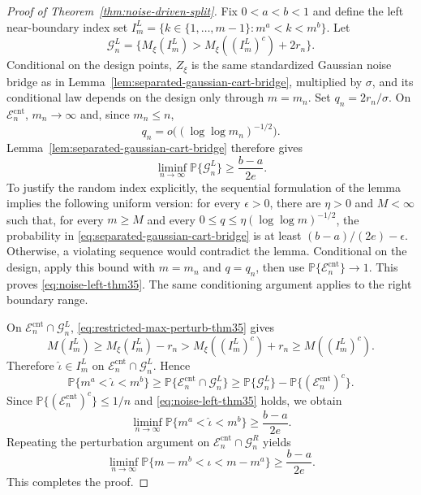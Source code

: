 \documentclass[11pt]{article}
\theoremstyle{plain}
\theoremstyle{definition}
\theoremstyle{remark}
\theoremstyle{plain}
\renewcommand{\P}{\mathbb{P}}
\newcommand{\1}{\mathbbm{1}}
\begin{document}
\begin{proof}[Proof of Theorem~\ref{thm:noise-driven-split}]
Fix $0<a<b<1$ and define the left near-boundary index set $I_m^L=\{k\in\{1,\ldots,m-1\}:m^a<k<m^b\}.$
Let
\[
    \mathcal G_n^L
    =
    \{M_\xi(I_m^L)>M_\xi((I_m^L)^c)+2r_n\}.
\]
Conditional on the design points, $Z_\xi$ is the same standardized Gaussian
noise bridge as in Lemma~\ref{lem:separated-gaussian-cart-bridge}, multiplied
by $\sigma$, and its conditional law depends on the design only through
$m=m_n$. Set $q_n=2r_n/\sigma$. On $\mathcal E_n^{\mathrm{cnt}}$,
$m_n\to\infty$ and, since $m_n\le n$,
\[
q_n=o\bigl((\log\log m_n)^{-1/2}\bigr).
\]
Lemma~\ref{lem:separated-gaussian-cart-bridge} therefore gives
\begin{equation}\label{eq:noise-left-thm35}
    \liminf_{n\to\infty}\P\{\mathcal G_n^L\}
    \ge
    \frac{b-a}{2e}.
\end{equation}
To justify the random index explicitly, the sequential formulation of the
lemma implies the following uniform version: for every $\epsilon>0$, there
are $\eta>0$ and $M<\infty$ such that, for every $m\ge M$ and every
$0\le q\le\eta(\log\log m)^{-1/2}$, the probability in
\eqref{eq:separated-gaussian-cart-bridge} is at least
$(b-a)/(2e)-\epsilon$. Otherwise, a violating sequence would contradict
the lemma. Conditional on the design, apply this bound with
$m=m_n$ and $q=q_n$, then use
$\P\{\mathcal E_n^{\mathrm{cnt}}\}\to1$. This proves
\eqref{eq:noise-left-thm35}. The same conditioning argument applies to
the right boundary range.

On $\mathcal E_n^{\mathrm{cnt}}\cap\mathcal G_n^L$, \eqref{eq:restricted-max-perturb-thm35} gives
\[
    M(I_m^L)
    \ge
    M_\xi(I_m^L)-r_n
    >
    M_\xi((I_m^L)^c)+r_n
    \ge
    M((I_m^L)^c).
\]
Therefore $\widehat\iota\in I_m^L$ on $\mathcal E_n^{\mathrm{cnt}}\cap\mathcal G_n^L$. Hence
\begin{equation}
    \P\{m^a<\widehat\iota<m^b\}
    \ge
    \P\{\mathcal E_n^{\mathrm{cnt}}\cap\mathcal G_n^L\}
    \ge
    \P\{\mathcal G_n^L\}-\P\{(\mathcal E_n^{\mathrm{cnt}})^c\}.
\end{equation}
Since $\P\{(\mathcal E_n^{\mathrm{cnt}})^c\}\le 1/n$ and \eqref{eq:noise-left-thm35} holds, we obtain
\begin{equation}
    \liminf_{n\to\infty}
    \P\{m^a<\widehat\iota<m^b\}
    \ge
    \frac{b-a}{2e}.
\end{equation}
Repeating the perturbation argument on $\mathcal E_n^{\mathrm{cnt}}\cap\mathcal G_n^R$ yields
\begin{equation}
    \liminf_{n\to\infty}
    \P\{m-m^b<\widehat\iota<m-m^a\}
    \ge
    \frac{b-a}{2e}.
\end{equation}
This completes the proof.
\end{proof}
\end{document}
